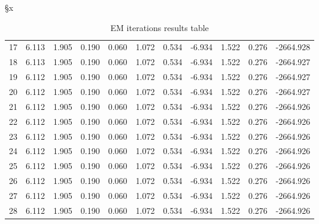 §x\documentclass[]{article}
\begin{document}
\begin{table}[H]
{\begin{tabular}{|c|c|c|c|c|c|c|c|c|c|c|}
		17 & 6.113  & 1.905  & 0.190  & 0.060  & 1.072  & 0.534  & -6.934  & 1.522  & 0.276  & -2664.928 \\
		18 & 6.113  & 1.905  & 0.190  & 0.060  & 1.072  & 0.534  & -6.934  & 1.522  & 0.276  & -2664.927 \\
		19 & 6.112  & 1.905  & 0.190  & 0.060  & 1.072  & 0.534  & -6.934  & 1.522  & 0.276  & -2664.927 \\
		20 & 6.112  & 1.905  & 0.190  & 0.060  & 1.072  & 0.534  & -6.934  & 1.522  & 0.276  & -2664.927 \\
		21 & 6.112  & 1.905  & 0.190  & 0.060  & 1.072  & 0.534  & -6.934  & 1.522  & 0.276  & -2664.926 \\
		22 & 6.112  & 1.905  & 0.190  & 0.060  & 1.072  & 0.534  & -6.934  & 1.522  & 0.276  & -2664.926 \\
		23 & 6.112  & 1.905  & 0.190  & 0.060  & 1.072  & 0.534  & -6.934  & 1.522  & 0.276  & -2664.926 \\
		24 & 6.112  & 1.905  & 0.190  & 0.060  & 1.072  & 0.534  & -6.934  & 1.522  & 0.276  & -2664.926 \\
		25 & 6.112  & 1.905  & 0.190  & 0.060  & 1.072  & 0.534  & -6.934  & 1.522  & 0.276  & -2664.926 \\
		26 & 6.112  & 1.905  & 0.190  & 0.060  & 1.072  & 0.534  & -6.934  & 1.522  & 0.276  & -2664.926 \\
		27 & 6.112  & 1.905  & 0.190  & 0.060  & 1.072  & 0.534  & -6.934  & 1.522  & 0.276  & -2664.926 \\
		28 & 6.112  & 1.905  & 0.190  & 0.060  & 1.072  & 0.534  & -6.934  & 1.522  & 0.276  & -2664.926 \\
		\hline
	\end{tabular}
	}
	\caption{EM iterations results table}
	\label{tab:gmm_iterations_3dp}
\end{table}
\end{document}
